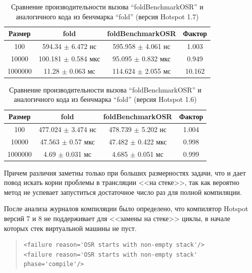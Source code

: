 \begin{table}[h]
\begin{center}
\begin{tabular}{|c|c|c|c|} \hline
Размер & fold & foldBenchmarkOSR & Фактор \\ \hline
100 & 594.34 $\pm$ 6.472 нс & 595.958 $\pm$ 4.061 нс & 1.003\\ \hline
10000 & 100.181 $\pm$ 0.584 мкс & 95.095 $\pm$ 0.832 мкс & 0.949\\ \hline
1000000 & 11.28 $\pm$ 0.063 мс & 114.624 $\pm$ 2.055 мс & 10.162\\ \hline
\end{tabular}
\caption{Сравнение производительности вызова ``foldBenchmarkOSR'' и аналогичного кода из бенчмарка ``fold'' (версия Hotspot 1.7)}
\label{bm:foldOSR2}
\end{center}
\end{table}

\begin{table}[h]
\begin{center}
\begin{tabular}{|c|c|c|c|} \hline
Размер & fold & foldBenchmarkOSR & Фактор \\ \hline
100 & 477.024 $\pm$ 3.474 нс & 478.739 $\pm$ 5.202 нс & 1.004\\ \hline
10000 & 47.563 $\pm$ 0.57 мкс & 47.482 $\pm$ 0.422 мкс & 0.998\\ \hline
1000000 & 4.69 $\pm$ 0.031 мс & 4.685 $\pm$ 0.051 мс & 0.999\\ \hline
\end{tabular}
\caption{Сравнение производительности вызова ``foldBenchmarkOSR'' и аналогичного кода из бенчмарка ``fold'' (версия Hotspot 1.6)}
\label{bm:foldOSR3}
\end{center}
\end{table}
Причем различия заметны только при больших размерностях задачи, что и дает повод искать корни
проблемы в трансляции <<на стеке>>, так как вероятно метод не успевает запуститься достаточное
число раз для полной компиляции.

После анализа журналов компиляции было определено, что компилятор Hotspot версий 7 и 8
не поддерживает для <<замены на стеке>> циклы, в начале которых стек виртуальной машины не пуст.

\begin{quote}
\begin{verbatim}
<failure reason='OSR starts with non-empty stack'/>
<failure reason='OSR starts with non-empty stack' phase='compile'/>
\end{verbatim}

\end{quote}

